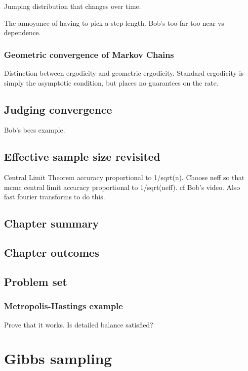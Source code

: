 \documentclass[11pt,fullpage]{book}
\begin{document}
Jumping distribution that changes over time.

The annoyance of having to pick a step length. Bob's too far too near vs dependence.

\subsection{Geometric convergence of Markov Chains}\label{sec:metropolisHastings_geometricConvergenceMarkovChain}

Distinction between ergodicity and geometric ergodicity. Standard ergodicity is simply the asymptotic condition, but places no guarantees on the rate. 

\section{Judging convergence}\label{sec:MetropolisHastings_convergence}

Bob's bees example.

\section{Effective sample size revisited}\label{sec:MH_effectiveSampleSizeRevisited}
Central Limit Theorem accuracy proportional to 1/sqrt(n). Choose neff so that mcmc central limit accuracy proportional to 1/sqrt(neff). cf Bob's video. Also fast fourier transforms to do this.

\section{Chapter summary}
\section{Chapter outcomes}

\section{Problem set}
\subsection{Metropolis-Hastings example}
Prove that it works. Is detailed balance satisfied?

\chapter{Gibbs sampling}\label{chap:Gibbs}
\end{document}
